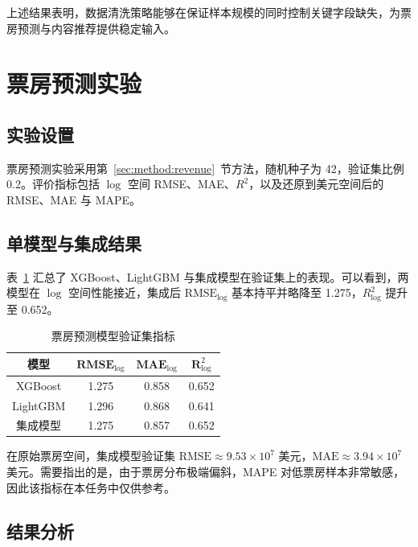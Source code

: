 上述结果表明，数据清洗策略能够在保证样本规模的同时控制关键字段缺失，为票房预测与内容推荐提供稳定输入。

\section{票房预测实验}
\label{sec:exp:revenue}

\subsection{实验设置}

票房预测实验采用第~\ref{sec:method:revenue}~节方法，随机种子为 42，验证集比例 0.2。评价指标包括 $\log$ 空间 RMSE、MAE、$R^2$，以及还原到美元空间后的 RMSE、MAE 与 MAPE。

\subsection{单模型与集成结果}

表~\ref{tab:revenue-metrics} 汇总了 XGBoost、LightGBM 与集成模型在验证集上的表现。可以看到，两模型在 $\log$ 空间性能接近，集成后 $\text{RMSE}_{\log}$ 基本持平并略降至 1.275，$R^2_{\log}$ 提升至 0.652。

\begin{table}[htbp]
    \centering
    \caption{票房预测模型验证集指标} \label{tab:revenue-metrics}
    \renewcommand{\arraystretch}{1.2}
    \setlength{\tabcolsep}{12pt}
    \begin{tabular}{|c|c|c|c|}
        \hline
        \textbf{模型} & $\textbf{RMSE}_{\log}$ & $\textbf{MAE}_{\log}$ & $\textbf{R}^2_{\log}$ \\
        \hline
        XGBoost  & 1.275 & 0.858 & 0.652 \\
        \hline
        LightGBM & 1.296 & 0.868 & 0.641 \\
        \hline
        集成模型 & 1.275 & 0.857 & 0.652 \\
        \hline
    \end{tabular}
\end{table}

在原始票房空间，集成模型验证集 $\text{RMSE} \approx 9.53 \times 10^7$ 美元，$\text{MAE} \approx 3.94 \times 10^7$ 美元。需要指出的是，由于票房分布极端偏斜，MAPE 对低票房样本非常敏感，因此该指标在本任务中仅供参考。

\subsection{结果分析}

